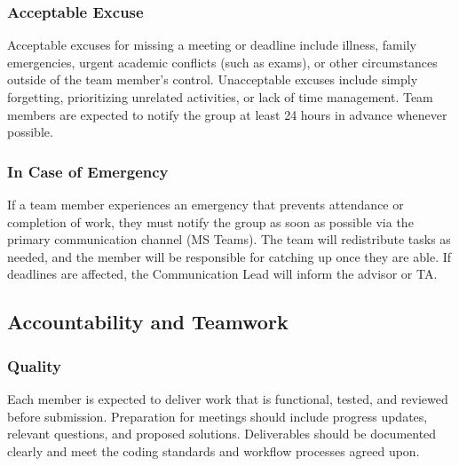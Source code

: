 \documentclass{article}
\begin{document}
\subsubsection*{Acceptable Excuse}
Acceptable excuses for missing a meeting or deadline include illness, family emergencies, 
urgent academic conflicts (such as exams), or other circumstances outside of the team 
member's control. Unacceptable excuses include simply forgetting, prioritizing unrelated 
activities, or lack of time management. Team members are expected to notify the group 
at least 24 hours in advance whenever possible.

\subsubsection*{In Case of Emergency}

If a team member experiences an emergency that prevents attendance or completion of work, 
they must notify the group as soon as possible via the primary communication channel (MS Teams). 
The team will redistribute tasks as needed, and the member will be responsible for catching up 
once they are able. If deadlines are affected, the Communication Lead will inform the advisor or TA.



\subsection*{Accountability and Teamwork}

\subsubsection*{Quality} 
Each member is expected to deliver work that is functional, tested, and reviewed before submission. 
Preparation for meetings should include progress updates, relevant questions, and proposed solutions. 
Deliverables should be documented clearly and meet the coding standards and workflow processes agreed upon.

\end{document}
